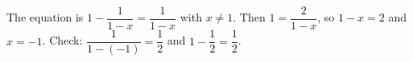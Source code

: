 The equation is $1-\dfrac{1}{1-x}=\dfrac{1}{1-x}$ with $x\ne1$. Then $1=\dfrac{2}{1-x}$, so $1-x=2$ and $x=\boxed{-1}$. Check: $\dfrac{1}{1-(-1)}=\dfrac{1}{2}$ and $1-\dfrac{1}{2}=\dfrac{1}{2}$.
